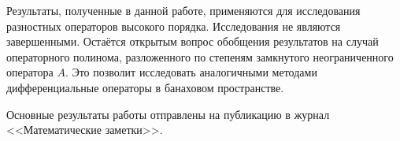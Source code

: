 \conclusion
Результаты, полученные в данной работе, применяются для исследования разностных операторов высокого порядка. Исследования не являются завершенными. Остаётся открытым вопрос обобщения результатов на случай операторного полинома, разложенного по степеням замкнутого неограниченного оператора $A$. Это позволит исследовать аналогичными методами дифференциальные операторы в банаховом пространстве.

Основные результаты работы отправлены на публикацию в журнал <<Математические заметки>>.
